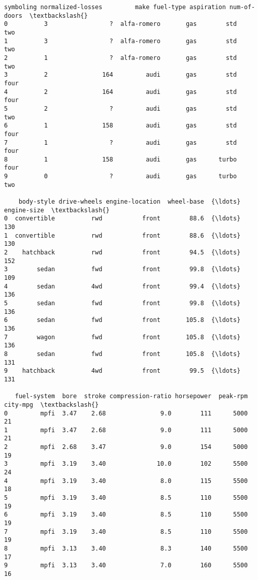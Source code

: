 \documentclass[11pt]{article}
\newcommand{\prompt}[4]{
        \llap{{\color{#2}[#3]: #4}}\vspace{-1.25em}
    }
\begin{document}
            \begin{tcolorbox}[breakable, boxrule=.5pt, size=fbox, pad at break*=1mm, opacityfill=0]
\prompt{Out}{outcolor}{7}{\hspace{3.5pt}}
\begin{Verbatim}[commandchars=\\\{\}]
   symboling normalized-losses         make fuel-type aspiration num-of-doors  \textbackslash{}
0          3                 ?  alfa-romero       gas        std          two
1          3                 ?  alfa-romero       gas        std          two
2          1                 ?  alfa-romero       gas        std          two
3          2               164         audi       gas        std         four
4          2               164         audi       gas        std         four
5          2                 ?         audi       gas        std          two
6          1               158         audi       gas        std         four
7          1                 ?         audi       gas        std         four
8          1               158         audi       gas      turbo         four
9          0                 ?         audi       gas      turbo          two

    body-style drive-wheels engine-location  wheel-base  {\ldots}  engine-size  \textbackslash{}
0  convertible          rwd           front        88.6  {\ldots}          130
1  convertible          rwd           front        88.6  {\ldots}          130
2    hatchback          rwd           front        94.5  {\ldots}          152
3        sedan          fwd           front        99.8  {\ldots}          109
4        sedan          4wd           front        99.4  {\ldots}          136
5        sedan          fwd           front        99.8  {\ldots}          136
6        sedan          fwd           front       105.8  {\ldots}          136
7        wagon          fwd           front       105.8  {\ldots}          136
8        sedan          fwd           front       105.8  {\ldots}          131
9    hatchback          4wd           front        99.5  {\ldots}          131

   fuel-system  bore  stroke compression-ratio horsepower  peak-rpm city-mpg  \textbackslash{}
0         mpfi  3.47    2.68               9.0        111      5000       21
1         mpfi  3.47    2.68               9.0        111      5000       21
2         mpfi  2.68    3.47               9.0        154      5000       19
3         mpfi  3.19    3.40              10.0        102      5500       24
4         mpfi  3.19    3.40               8.0        115      5500       18
5         mpfi  3.19    3.40               8.5        110      5500       19
6         mpfi  3.19    3.40               8.5        110      5500       19
7         mpfi  3.19    3.40               8.5        110      5500       19
8         mpfi  3.13    3.40               8.3        140      5500       17
9         mpfi  3.13    3.40               7.0        160      5500       16


\end{Verbatim}
\end{tcolorbox}
\end{document}
